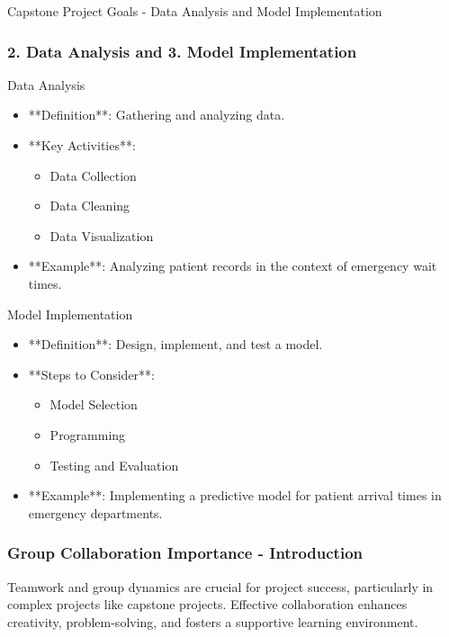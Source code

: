 \documentclass[aspectratio=169]{beamer}
\begin{document}
\begin{frame}[fragile]{Capstone Project Goals - Data Analysis and Model Implementation}
    \frametitle{2. Data Analysis and 3. Model Implementation}
    \begin{block}{Data Analysis}
        \begin{itemize}
            \item **Definition**: Gathering and analyzing data.
            \item **Key Activities**:
                \begin{itemize}
                    \item Data Collection
                    \item Data Cleaning
                    \item Data Visualization
                \end{itemize}
            \item **Example**: Analyzing patient records in the context of emergency wait times.
        \end{itemize}
    \end{block}

    \begin{block}{Model Implementation}
        \begin{itemize}
            \item **Definition**: Design, implement, and test a model.
            \item **Steps to Consider**:
                \begin{itemize}
                    \item Model Selection
                    \item Programming
                    \item Testing and Evaluation
                \end{itemize}
            \item **Example**: Implementing a predictive model for patient arrival times in emergency departments.
        \end{itemize}
    \end{block}
\end{frame}

\begin{frame}[fragile]
    \frametitle{Group Collaboration Importance - Introduction}
    Teamwork and group dynamics are crucial for project success, particularly in complex projects like capstone projects. Effective collaboration enhances creativity, problem-solving, and fosters a supportive learning environment.
\end{frame}
\end{document}
